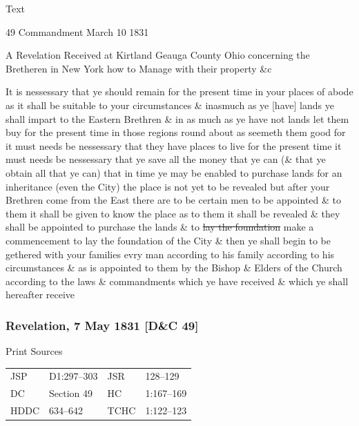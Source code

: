 			\begin{description}
				\item[Text]
			\end{description}
			
				\begin{tightcenter}
				49 Commandment March 10 1831
				\end{tightcenter}
				
				A Revelation Received at Kirtland Geauga County Ohio concerning the Bretheren in New York how to Manage with their property \&c
				
				It is nessessary that ye should remain for the present time in your places of abode as it shall be suitable to your circumstances \& inasmuch as ye [have] lands ye shall impart to the Eastern Brethren \& in as much as ye have not lands let them buy for the present time in those regions round about as seemeth them good for it must needs be nessessary that they have places to live for the present time it must needs be nessessary that ye save all the money that ye can (\& that ye obtain all that ye can) that in time ye may be enabled to purchase lands for an inheritance (even the City) the place is not yet to be revealed but after your Brethren come from the East there are to be certain men to be appointed \& to them it shall be given to know the place as to them it shall be revealed \& they shall be appointed to purchase the lands \& to \sout{lay the foundation} make a commencement to lay the foundation of the City \& then ye shall begin to be gethered with your families evry man according to his family according to his circumstances \& as is appointed to them by the Bishop \& Elders of the Church according to the laws \& commandments which ye have received \& which ye shall hereafter receive
				
		\subsubsection{Revelation, 7 May 1831 [D\&C 49]}
			\label{EMS-1831-JS-7-MAY-1831}
		
			\begin{description}
				\item[Print Sources]
			\end{description}

				\begin{tabular}{p{0.5in}p{1in}p{0.5in}p{1in}}
				JSP	 	& D1:297--303	& JSR 		& 128--129 \\
				DC	 	& Section 49 	& HC 		& 1:167--169 \\
				HDDC 	& 634--642		& TCHC 		& 1:122--123 \\
				\end{tabular}
			
